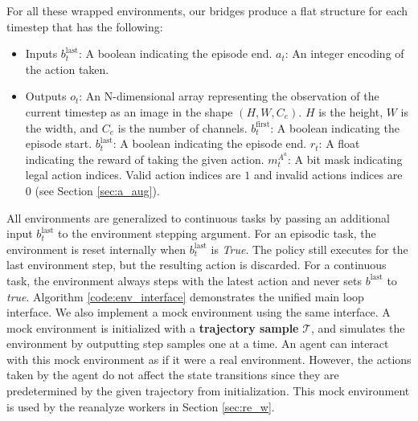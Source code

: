 For all these wrapped environments, our bridges produce a flat structure for each timestep that has the following:
\begin{itemize}
    \item Inputs
          \subitem $b^{\text{last}}_{t}$: A boolean indicating the episode end.
          \subitem $a_t$: An integer encoding of the action taken.
    \item Outputs
          \subitem $o_t$:
          An N-dimensional array representing the observation of the current timestep as an image
          in the shape $(H, W, C_e)$. $H$ is the height, $W$ is the width, and $C_e$ is the number of channels.
          \subitem $b^{\text{first}}_{t}$: A boolean indicating the episode start.
          \subitem $b^{\text{last}}_{t}$: A boolean indicating the episode end.
          \subitem $r_t$: A float indicating the reward of taking the given action.
          \subitem $m^{A^a}_t$: A bit mask indicating legal action indices. Valid
          action indices are $1$ and invalid actions indices are $0$ (see Section \ref{sec:a_aug}).
\end{itemize}

All environments are generalized to continuous tasks by passing an additional input $b^\text{last}_t$ to the environment stepping argument.
For an episodic task, the environment is reset internally when $b^{\text{last}}_t$ is \textit{True}.
The policy still executes for the last environment step, but the resulting action is discarded.
For a continuous task, the environment always steps with the latest action and never sets $b^\text{last}$ to \textit{true}.
Algorithm \ref{code:env_interface} demonstrates the unified main loop interface.
We also implement a mock environment \cite{MockObject__2021} using the same interface.
A mock environment is initialized with a \textbf{trajectory sample} $\mathcal{T}$, and simulates the environment by outputting step samples one at a time.
An agent can interact with this mock environment as if it were a real environment.
However, the actions taken by the agent do not affect the state transitions since they are predetermined by the given trajectory from initialization.
This mock environment is used by the reanalyze workers in Section \ref{sec:re_w}.


